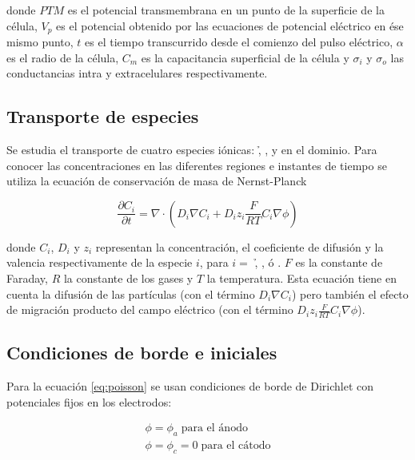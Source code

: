 donde $PTM$ es el potencial transmembrana en un punto de la superficie de la célula, $V_p$ es el potencial obtenido por las ecuaciones de potencial eléctrico en ése mismo punto, $t$ es el tiempo transcurrido desde el comienzo del pulso eléctrico, $\alpha$ es el radio de la célula, $C_m$ es la capacitancia superficial de la célula y $\sigma_i$ y $\sigma_o$ las conductancias intra y extracelulares respectivamente.

\subsection*{Transporte de especies}
Se estudia el transporte de cuatro especies iónicas: \h, \oh, \na{} y \cl{} en el dominio. Para conocer las concentraciones en las diferentes regiones e instantes de tiempo se utiliza la ecuación de conservación de masa de Nernst-Planck \cite{c6-fodava}


\begin{equation} \label{eq:trans}
	\frac{\partial C_i}{\partial t} = \nabla \cdot \left( D_i \nabla C_i + D_i z_i \frac{F}{R T} C_i \nabla \phi \right)
\end{equation}

donde $C_i$, $D_i$ y $z_i$ representan la concentración, el coeficiente de difusión y la valencia respectivamente de la especie $i$, para $i = $ \h, \oh, \na{} ó \cl.
$F$ es la constante de Faraday, $R$ la constante de los gases y $T$ la temperatura. 
Esta ecuación tiene en cuenta la difusión de las partículas (con el término $D_i \nabla C_i$) pero también el efecto de migración producto del campo eléctrico (con el término $D_i z_i \frac{F}{R T} C_i \nabla \phi$). 

\subsection*{Condiciones de borde e iniciales}
Para la ecuación \ref{eq:poisson} se usan condiciones de borde de Dirichlet con potenciales fijos en los electrodos:

\begin{equation} \begin{split}
	\phi = \phi_a \; \textrm{para el ánodo} \\ \phi = \phi_c = 0 \; \textrm{para el cátodo}
\end{split} \end{equation}

